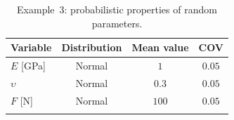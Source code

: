 \documentclass[preprint,3p]{elsarticle}
\begin{document}
\begin{linenumbers}
\begin{table}[t]
	\caption{Example~3: probabilistic properties of random parameters.}
	\label{Table5}
	\begin{center}
		\begin{tabular}{lccc}
			\hline \noalign{\smallskip}
			Variable & Distribution & Mean value & COV\\
			\hline \noalign{\smallskip}
			$E$ [GPa] &    Normal  & $1$ & $0.05$\\
			$\upsilon$ &    Normal &    $0.3$ &  $0.05$\\
			$F$ [N] &    Normal &    $100$ &  $0.05$\\
			\hline \noalign{\smallskip}
		\end{tabular}
	\end{center}
\end{table}

\begin{table}[t!]
	\caption{Example~3: optimization results from DTO and RBTO problems.}
	\label{Table6}
	\begin{center}
	\end{center}
\end{table} 


\end{linenumbers}
\end{document}

